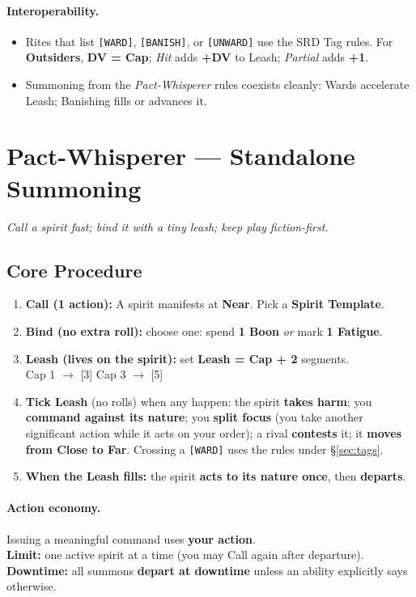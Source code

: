 \documentclass[11pt]{article}
\begin{document}
\paragraph{Interoperability.}
\begin{itemize}
  \item Rites that list \texttt{[WARD]}, \texttt{[BANISH]}, or \texttt{[UNWARD]} use the SRD Tag rules. For \textbf{Outsiders}, \textbf{DV = Cap}; \emph{Hit} adds \textbf{+DV} to Leash; \emph{Partial} adds \textbf{+1}.
  \item Summoning from the \emph{Pact-Whisperer} rules coexists cleanly: Wards accelerate Leash; Banishing fills or advances it.
\end{itemize}

\section{Pact-Whisperer — Standalone Summoning}

\textit{Call a spirit fast; bind it with a tiny leash; keep play fiction-first.}

\subsection*{Core Procedure}
\begin{enumerate}
  \item \textbf{Call (1 action):} A spirit manifests at \textbf{Near}. Pick a \textbf{Spirit Template}.
  \item \textbf{Bind (no extra roll):} choose one: spend \textbf{1 Boon} \emph{or} mark \textbf{1 Fatigue}.
  \item \textbf{Leash (lives on the spirit):} set \textbf{Leash = Cap + 2} segments. \\
        Cap 1 $\rightarrow$ [3] \hspace{1em} Cap 3 $\rightarrow$ [5]
  \item \textbf{Tick Leash} (no rolls) when any happen: the spirit \textbf{takes harm}; you \textbf{command against its nature}; you \textbf{split focus} (you take another significant action while it acts on your order); a rival \textbf{contests} it; it \textbf{moves from Close to Far}. Crossing a \texttt{[WARD]} uses the rules under \S\ref{sec:tags}.
  \item \textbf{When the Leash fills:} the spirit \textbf{acts to its nature once}, then \textbf{departs}.
\end{enumerate}

\paragraph{Action economy.} Issuing a meaningful command uses \textbf{your action}. \\
\textbf{Limit:} one active spirit at a time (you may Call again after departure). \\
\textbf{Downtime:} all summons \textbf{depart at downtime} unless an ability explicitly says otherwise.
\end{document}

